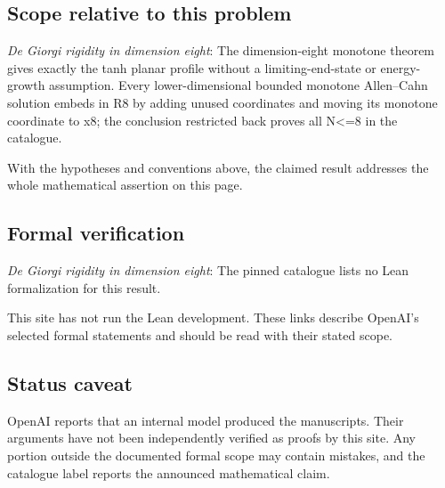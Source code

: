 \documentclass[11pt]{article}
\begin{document}
\subsection{Scope relative to this problem}
\textit{De Giorgi rigidity in dimension eight}: The dimension-eight monotone theorem gives exactly the tanh planar profile without a limiting-end-state or energy-growth assumption. Every lower-dimensional bounded monotone Allen–Cahn solution embeds in R8 by adding unused coordinates and moving its monotone coordinate to x8; the conclusion restricted back proves all N<=8 in the catalogue.

With the hypotheses and conventions above, the claimed result addresses the whole mathematical assertion on this page.

\subsection{Formal verification}
\textit{De Giorgi rigidity in dimension eight}: The pinned catalogue lists no Lean formalization for this result.

This site has not run the Lean development. These links describe OpenAI’s selected formal statements and should be read with their stated scope.

\subsection{Status caveat}
OpenAI reports that an internal model produced the manuscripts. Their arguments have not been independently verified as proofs by this site. Any portion outside the documented formal scope may contain mistakes, and the catalogue label reports the announced mathematical claim.
\end{document}

